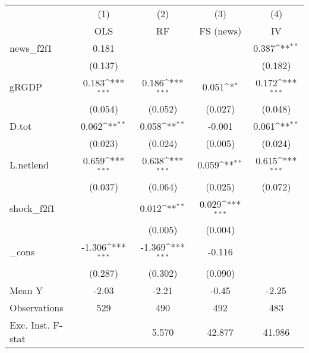 {
\def\sym#1{\ifmmode^{#1}\else\(^{#1}\)\fi}
\begin{tabular}{l*{4}{c}}
\toprule
            &\multicolumn{1}{c}{(1)}&\multicolumn{1}{c}{(2)}&\multicolumn{1}{c}{(3)}&\multicolumn{1}{c}{(4)}\\
            &\multicolumn{1}{c}{OLS}&\multicolumn{1}{c}{RF}&\multicolumn{1}{c}{FS (news)}&\multicolumn{1}{c}{IV}\\
\midrule
news\_f2f1   &       0.181         &                     &                     &       0.387\sym{**} \\
            &     (0.137)         &                     &                     &     (0.182)         \\
\addlinespace
gRGDP       &       0.183\sym{***}&       0.186\sym{***}&       0.051\sym{*}  &       0.172\sym{***}\\
            &     (0.054)         &     (0.052)         &     (0.027)         &     (0.048)         \\
\addlinespace
D.tot       &       0.062\sym{**} &       0.058\sym{**} &      -0.001         &       0.061\sym{**} \\
            &     (0.023)         &     (0.024)         &     (0.005)         &     (0.024)         \\
\addlinespace
L.netlend   &       0.659\sym{***}&       0.638\sym{***}&       0.059\sym{**} &       0.615\sym{***}\\
            &     (0.037)         &     (0.064)         &     (0.025)         &     (0.072)         \\
\addlinespace
shock\_f2f1  &                     &       0.012\sym{**} &       0.029\sym{***}&                     \\
            &                     &     (0.005)         &     (0.004)         &                     \\
\addlinespace
\_cons      &      -1.306\sym{***}&      -1.369\sym{***}&      -0.116         &                     \\
            &     (0.287)         &     (0.302)         &     (0.090)         &                     \\
\midrule
Mean Y      &       -2.03         &       -2.21         &       -0.45         &       -2.25         \\
Observations&         529         &         490         &         492         &         483         \\
Exc. Inst. F-stat&                     &       5.570         &      42.877         &      41.986         \\
\bottomrule
\end{tabular}
}
